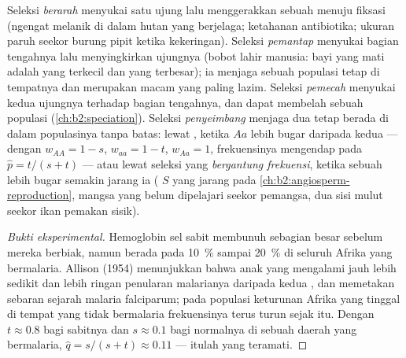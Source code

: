 \begin{proposition}\label{prop:b2:population-genetics:kinds}
%
Seleksi \emph{berarah} menyukai satu ujung lalu menggerakkan sebuah
 menuju fiksasi (ngengat melanik di dalam hutan yang berjelaga;
ketahanan antibiotika; ukuran paruh seekor burung pipit ketika
kekeringan). Seleksi \emph{pemantap} menyukai bagian tengahnya lalu
menyingkirkan ujungnya (bobot lahir manusia: bayi yang mati adalah yang
terkecil dan yang terbesar); ia menjaga sebuah populasi tetap di
tempatnya dan merupakan macam yang paling lazim. Seleksi
\emph{pemecah} menyukai kedua ujungnya terhadap bagian tengahnya, dan
dapat membelah sebuah populasi (\cref{ch:b2:speciation}). Seleksi
\emph{penyeimbang} menjaga dua  tetap berada di dalam populasinya
tanpa batas: lewat \emph{}, ketika $Aa$ lebih
bugar daripada kedua  --- dengan $w_{AA} = 1 - s$, $w_{aa} = 1 - t$, $w_{Aa} = 1$, frekuensinya mengendap pada $\hat p = t/(s + t)$ --- atau lewat seleksi yang \emph{bergantung frekuensi}, ketika
sebuah  lebih bugar semakin jarang ia ( $S$ yang jarang
pada \cref{ch:b2:angiosperm-reproduction}, mangsa yang belum dipelajari
seekor pemangsa, dua sisi mulut seekor ikan pemakan sisik).
\end{proposition}
\begin{proof}[Bukti eksperimental]
Hemoglobin sel sabit membunuh sebagian besar  sebelum
mereka berbiak, namun  berada pada \qty{10}{\%} sampai
\qty{20}{\%} di seluruh Afrika yang bermalaria. Allison (1954)
menunjukkan bahwa anak yang  mengalami jauh lebih sedikit
dan lebih ringan penularan malarianya daripada kedua , dan
 memetakan sebaran sejarah malaria falciparum; pada
populasi keturunan Afrika yang tinggal di tempat yang tidak bermalaria
frekuensinya terus turun sejak itu. Dengan $t \approx 0.8$ bagi
 sabitnya dan $s \approx 0.1$ bagi  normalnya di
sebuah daerah yang bermalaria, $\hat q = s/(s + t) \approx 0.11$ ---
itulah yang teramati.
\end{proof}

